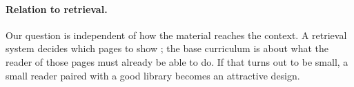\paragraph{Relation to retrieval.}
Our question is independent of how the material reaches the context.
A retrieval system decides which pages to show \citep{lewis2020rag}; the base curriculum is about what the reader of those pages must already be able to do.
If that turns out to be small, a small reader paired with a good library becomes an attractive design.
